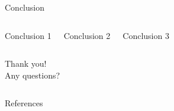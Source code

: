 \documentclass[aspectratio=169]{beamer}
\begin{document}
\begin{frame}[fragile]{Conclusion}
\begin{columns}[t]
    \begin{block}{\centering Conclusion 1}
    \end{block}

    \begin{exampleblock}{\centering Conclusion 2}
    \end{exampleblock}
    
    \begin{alertblock}{\centering Conclusion 3}
    \end{alertblock}        		
\end{columns}
\end{frame}

\begin{frame}
\vspace{80pt}
\centering
{
  Thank you!\\  
  Any questions?
}
\begin{columns}[t]
\end{columns}
\end{frame}

\begin{frame}[allowframebreaks]{References}

{\tiny
  
}
\end{frame}
\end{document}
